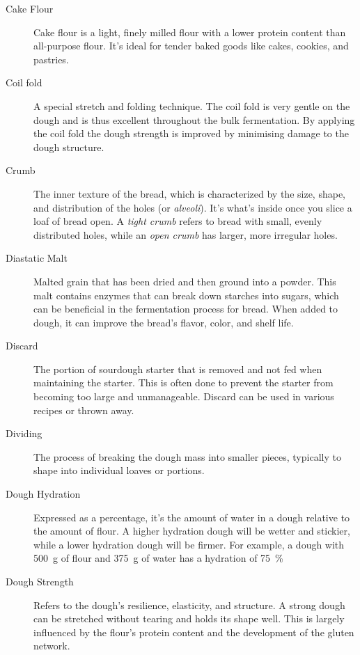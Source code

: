 \begin{description}
\item[Cake Flour] Cake flour is a light, finely milled flour with a lower protein
content than all-purpose flour. It's ideal for tender baked goods like cakes, cookies,
and pastries.

\item[Coil fold] A special stretch and folding technique. The coil fold is
very gentle on the dough and is thus excellent throughout the bulk fermentation.
By applying the coil fold the dough strength is improved by minimising damage
to the dough structure.

\item[Crumb] The inner texture of the bread, which is characterized by the size,
shape, and distribution of the holes (or \emph{alveoli}). It's what's inside once you slice
a loaf of bread open. A \emph{tight crumb} refers to bread with small, evenly distributed
holes, while an \emph{open crumb} has larger, more irregular holes.

\item[Diastatic Malt] Malted grain that has been dried and then ground into a powder.
This malt contains enzymes that can break down starches into sugars, which can be
beneficial in the fermentation process for bread. When added to dough, it can improve
the bread's flavor, color, and shelf life.

\item[Discard] The portion of sourdough starter that is removed and not fed when
maintaining the starter. This is often done to prevent the starter from becoming too
large and unmanageable. Discard can be used in various recipes or thrown away.

\item[Dividing] The process of breaking the dough mass into smaller pieces,
typically to shape into individual loaves or portions.

\item[Dough Hydration] Expressed as a percentage, it's the amount of water in a
dough relative to the amount of flour. A higher hydration dough will be wetter and
stickier, while a lower hydration dough will be firmer. For example, a dough
with \SI{500}{\gram} of flour and \SI{375}{\gram} of water has a hydration of
\SI{75}{\percent}

\item[Dough Strength] Refers to the dough's resilience, elasticity, and structure.
A strong dough can be stretched without tearing and holds its shape well. This is
largely influenced by the flour's protein content and the development of the gluten
network.


\end{description}
